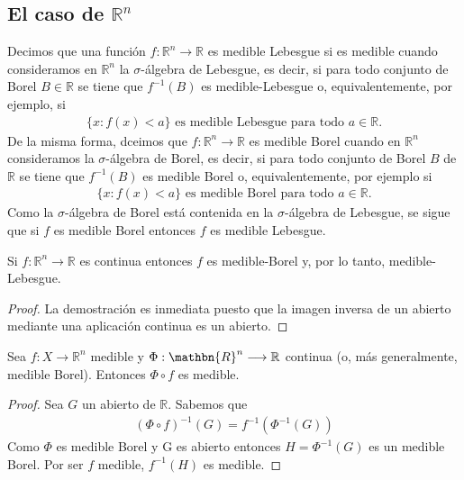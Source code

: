 \subsection{El caso de $\mathbb{R}^n$}
\begin{defi}
 Decimos que una función $f: \mathbb{R}^n \longrightarrow \mathbb{R}$ es medible Lebesgue si es medible cuando consideramos en $\mathbb{R}^n$ la $\sigma$-álgebra de Lebesgue, es decir, si para todo conjunto de Borel $B \in \mathbb{R}$ se tiene que $f^{-1}(B)$ es medible-Lebesgue o, equivalentemente, por ejemplo, si
 \begin{align*}
     \{ x : f(x) < a \} \text{ es medible Lebesgue para todo } a \in \mathbb{R}.
 \end{align*}
 De la misma forma, dceimos que  $f: \mathbb{R}^n \longrightarrow \mathbb{R}$ es medible Borel cuando en $\mathbb{R}^n$ consideramos la $\sigma$-álgebra de Borel, es decir, si para todo conjunto de Borel $B$ de $\mathbb{R}$ se tiene que $f^{-1}(B)$ es medible Borel o, equivalentemente, por ejemplo si
 \begin{align*}
     \{ x : f(x) < a \} \text{ es medible Borel para todo } a \in \mathbb{R}.
 \end{align*}
 Como la  $\sigma$-álgebra de Borel está contenida en la  $\sigma$-álgebra de Lebesgue, se sigue que si $f$ es medible Borel entonces $f$ es medible Lebesgue.
\end{defi}

\begin{prop}
Si $f: \mathbb{R}^n \longrightarrow \mathbb{R}$ es continua entonces $f$ es medible-Borel y, por lo tanto, medible-Lebesgue.
\end{prop}
\begin{proof}
La demostración es inmediata puesto que la imagen inversa de un abierto mediante una aplicación continua es un abierto.
\end{proof}

\begin{prop}
\label{prop:comp}
Sea $f: X \longrightarrow \mathbb{R}^n$ medible y $\Phi: \mathbn{R}^n \longrightarrow \mathbb{R}$ continua (o, más generalmente, medible Borel). Entonces $\Phi \circ{} f$ es medible.
\end{prop}

\begin{proof}
Sea $G$ un abierto de $\mathbb{R}$. Sabemos que
\begin{align*}
    (\Phi \circ{} f)^{-1}(G) = f^{-1}(\Phi^{-1}(G))
\end{align*}
Como $\Phi$ es medible Borel y G es abierto entonces $H = \Phi^{-1}(G)$ es un medible Borel. Por ser $f$ medible, $f^{-1}(H)$ es medible.
\end{proof}

